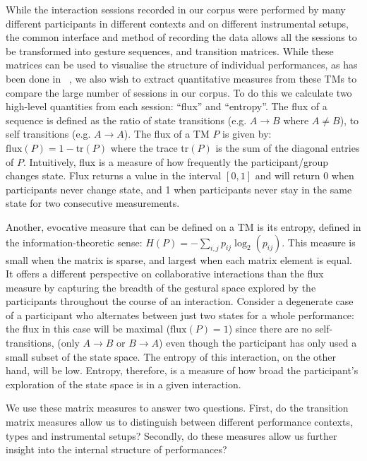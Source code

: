\documentclass{sigchi}
\begin{document}
While the interaction sessions recorded in our corpus were performed
by many different participants in
different contexts and on different instrumental setups, the common
interface and method of recording the data allows all the sessions to
be transformed into gesture sequences, and transition matrices. While
these matrices can be used to visualise the structure of individual
performances, as has been done in ~\cite{Swift:2014tya}, we also wish to extract quantitative
measures from these TMs to compare the large number of sessions in our
corpus.
To do this we calculate two high-level quantities from each session:
``flux'' and ``entropy''. The flux of a sequence is defined as the
ratio of state transitions (e.g. $A \rightarrow B$ where $A \neq B$),
to self transitions (e.g. $A \rightarrow A $). The flux of a TM $P$ is
given by: $\mathrm{flux}(P) = 1 - \mathrm{tr}(P)$ where the trace
$\mathrm{tr}(P)$ is the sum of the diagonal entries of $P$.
Intuitively, flux is a measure of how frequently the participant/group
changes state. Flux returns a value in the interval $[0,1]$ and will
return 0 when participants never change state, and 1 when participants
never stay in the same state for two consecutive measurements.

Another, evocative measure that can be defined on a TM is its
entropy, defined in the information-theoretic\cite{Shannon:1948rt}
sense: $H(P) = -\sum_{i,j}p_{ij}\log_2(p_{ij})$. This measure
is small when the matrix is sparse, and largest when each matrix
element is equal. It offers a different perspective on collaborative
interactions than the flux measure by capturing the breadth of the
gestural space explored by the participants throughout the course of
an interaction. Consider a degenerate case of a participant who
alternates between just two states for a whole performance: the flux in
this case will be maximal ($\mathrm{flux}(P) = 1$) since there are no
self-transitions, (only $A \rightarrow B$ or $ B \rightarrow A$) even
though the participant has only used a small subset of the state
space. The entropy of this interaction, on the other hand, will be
low. Entropy, therefore, is a measure of how broad the participant's
exploration of the state space is in a given interaction.

We use these matrix measures to answer
two questions. First, do the transition matrix measures allow us to
distinguish between different performance contexts, types and
instrumental setups? Secondly, do these measures allow us further
insight into the internal structure of performances?
\end{document}
